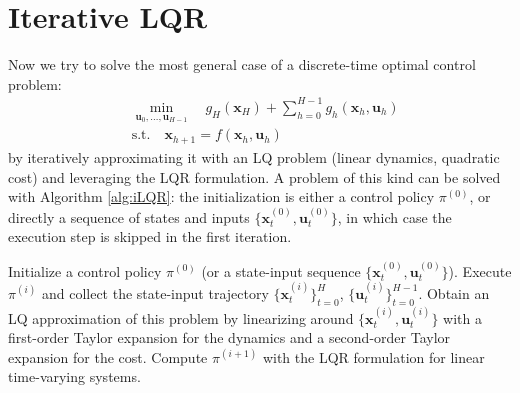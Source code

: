 \documentclass[10pt, a4paper]{report}
\begin{document}
\section{Iterative LQR}\label{sec:iLQR}
Now we try to solve the most general case of a discrete-time optimal control problem:\begin{align}
    &\operatorname*{\min}_{ \mathbf u_0,\dots,\mathbf u_{H-1}}\quad g_H(\mathbf x_H)+\sum_{h=0}^{H-1}g_h(\mathbf x_h,\mathbf u_h)\\ 
    &\text{s.t.}\quad \mathbf x_{h+1}=f(\mathbf x_h,\mathbf u_h)
\end{align}
by iteratively approximating it with an LQ problem (linear dynamics, quadratic cost) and leveraging the LQR formulation. A problem of this kind can be solved with Algorithm \ref{alg:iLQR}: the initialization is either a control policy $\pi^{(0)}$, or directly a sequence of states and inputs $\{\mathbf x_t^{(0)},\mathbf u_t^{(0)}\}$, in which case the execution step is skipped in the first iteration.

\begin{algorithm}[H]
\caption{Iterative  LQR}\label{alg:iLQR}
\begin{algorithmic}[1]
    \State Initialize a control policy $\pi^{(0)}$ (or a state-input sequence $\{\mathbf x_t^{(0)},\mathbf u_t^{(0)}\}$).
    \State Execute $\pi^{(i)}$ and collect the state-input trajectory $\{\mathbf x_t^{(i)}\}_{t=0}^H$, $\{\mathbf u_t^{(i)}\}_{t=0}^{H-1}$.
    \State Obtain an LQ approximation of this problem by linearizing around $\{\mathbf x_t^{(i)},\mathbf u_t^{(i)}\}$ with a first-order Taylor expansion for the dynamics and a second-order Taylor expansion for the cost.
    \State Compute $\pi^{(i+1)}$ with the LQR formulation for linear time-varying systems.
    \EndFor
\end{algorithmic}
\end{algorithm}
\end{document}
